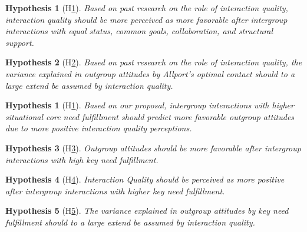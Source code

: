 \documentclass[nobib]{tufte-handout}
\theoremstyle{break}
\theoremstyle{plain}
\newtheorem{hyp}{Hypothesis}
\newtheorem{subhyp}{Hypothesis}
\begin{document}
\begin{subhyp}[H\ref{hyp:AllportsQuality}] \label{hyp:AllportsQuality}
\addtolength{\leftskip}{2.5em}
Based on  past research on the role of interaction quality, interaction quality should be more perceived as more favorable after intergroup interactions with equal status, common goals, collaboration, and structural support.
\end{subhyp}

\begin{subhyp}[H\ref{hyp:AllportsQualityMediation}] \label{hyp:AllportsQualityMediation}
\addtolength{\leftskip}{2.5em}
Based on  past research on the role of interaction quality, the variance explained in outgroup attitudes by Allport's optimal contact should to a large extend be assumed by interaction quality.
\end{subhyp}

\begin{hyp}[H\ref{hyp:keyNeed}] \label{hyp:keyNeed}
Based on our proposal, intergroup interactions with higher situational core need fulfillment should predict more favorable outgroup attitudes due to more positive interaction quality perceptions.
\end{hyp}

\setcounter{subhyp}{0}
\begin{subhyp}[H\ref{hyp:keyNeedPred}] \label{hyp:keyNeedPred}
\addtolength{\leftskip}{2.5em}
Outgroup attitudes should be more favorable after intergroup interactions with high key need fulfillment.
\end{subhyp}

\begin{subhyp}[H\ref{hyp:keyNeedQual}] \label{hyp:keyNeedQual}
\addtolength{\leftskip}{2.5em}
Interaction Quality should be perceived as more positive after intergroup interactions with higher key need fulfillment.
\end{subhyp}

\begin{subhyp}[H\ref{hyp:keyNeedMediation}] \label{hyp:keyNeedMediation}
\addtolength{\leftskip}{2.5em}
The  variance explained in outgroup attitudes by key need fulfillment should to a large extend be assumed by interaction quality.
\end{subhyp}
\end{document}
